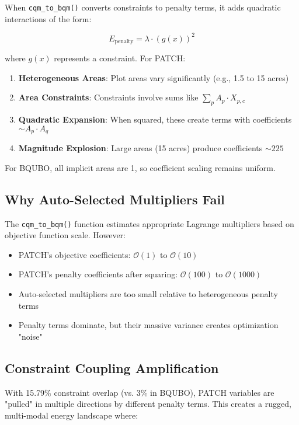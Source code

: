 \documentclass[11pt,a4paper]{article}
\begin{document}
When \texttt{cqm\_to\_bqm()} converts constraints to penalty terms, it adds quadratic interactions of the form:

\begin{equation}
E_{\text{penalty}} = \lambda \cdot (g(x))^2
\end{equation}

where $g(x)$ represents a constraint. For PATCH:

\begin{enumerate}
    \item \textbf{Heterogeneous Areas}: Plot areas vary significantly (e.g., 1.5 to 15 acres)
    \item \textbf{Area Constraints}: Constraints involve sums like $\sum_p A_p \cdot X_{p,c}$
    \item \textbf{Quadratic Expansion}: When squared, these create terms with coefficients $\sim A_p \cdot A_q$
    \item \textbf{Magnitude Explosion}: Large areas (15 acres) produce coefficients $\sim 225$
\end{enumerate}

For BQUBO, all implicit areas are 1, so coefficient scaling remains uniform.

\subsection{Why Auto-Selected Multipliers Fail}

The \texttt{cqm\_to\_bqm()} function estimates appropriate Lagrange multipliers based on objective function scale. However:

\begin{itemize}
    \item PATCH's objective coefficients: $\mathcal{O}(1)$ to $\mathcal{O}(10)$
    \item PATCH's penalty coefficients after squaring: $\mathcal{O}(100)$ to $\mathcal{O}(1000)$
    \item Auto-selected multipliers are too small relative to heterogeneous penalty terms
    \item Penalty terms dominate, but their massive variance creates optimization "noise"
\end{itemize}

\subsection{Constraint Coupling Amplification}

With 15.79\% constraint overlap (vs. 3\% in BQUBO), PATCH variables are "pulled" in multiple directions by different penalty terms. This creates a rugged, multi-modal energy landscape where:
\end{document}
